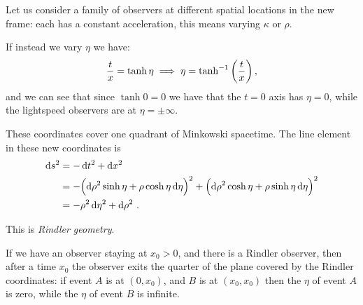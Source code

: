 \documentclass[main.tex]{subfiles}
\begin{document}
Let us consider a family of observers at different spatial locations in the new frame: each has a constant acceleration, this means varying \(\kappa \) or \(\rho \).

If instead we vary \(\eta \) we have: 
%
\begin{align}
  \frac{t}{x} = \tanh \eta \implies 
  \eta = \tanh^{-1} \qty(\frac{t}{x})
\,,
\end{align}
%
and we can see that since \(\tanh 0 = 0 \) we have that the \(t=0\) axis has \(\eta = 0\), while the lightspeed observers are at \(\eta = \pm \infty\). 

These coordinates cover one quadrant of Minkowski spacetime. 
The line element in these new coordinates is 
%
\begin{subequations}
\begin{align}
  \dd{s^2} &= - \dd{t^2} + \dd{x^2}   \\
  &= - \qty(\dd{\rho^2} \sinh \eta  + \rho \cosh \eta \dd{\eta })^2
  + \qty( \dd{\rho^2} \cosh \eta + \rho \sinh \eta \dd{\eta })^2  \\
  &= - \rho^2 \dd{\eta^2} + \dd{\rho^2}
\,.
\end{align}
\end{subequations}
%

This is \emph{Rindler geometry}. 

If we have an observer staying at \(x_0 >0\), and there is a Rindler observer, then after a time \(x_0\) the observer exits the quarter of the plane covered by the Rindler coordinates: if event \(A\) is at \((0, x_0 )\), and \(B\) is at \((x_0 , x_0 )\) then the \(\eta \) of event \(A\) is zero, while the \(\eta \) of event \(B\) is infinite. 
\end{document}

